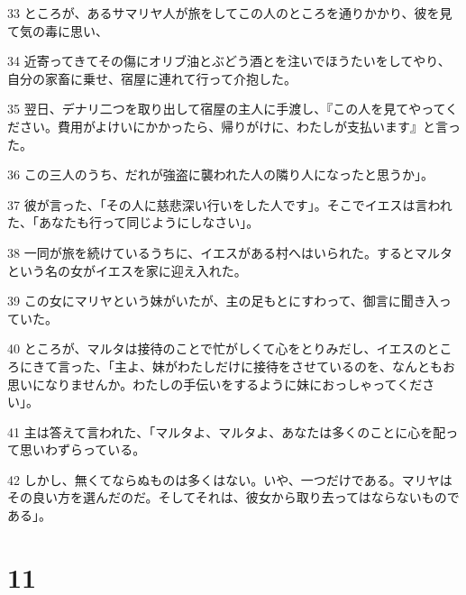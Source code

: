 \par 33 ところが、あるサマリヤ人が旅をしてこの人のところを通りかかり、彼を見て気の毒に思い、
\par 34 近寄ってきてその傷にオリブ油とぶどう酒とを注いでほうたいをしてやり、自分の家畜に乗せ、宿屋に連れて行って介抱した。
\par 35 翌日、デナリ二つを取り出して宿屋の主人に手渡し、『この人を見てやってください。費用がよけいにかかったら、帰りがけに、わたしが支払います』と言った。
\par 36 この三人のうち、だれが強盗に襲われた人の隣り人になったと思うか」。
\par 37 彼が言った、「その人に慈悲深い行いをした人です」。そこでイエスは言われた、「あなたも行って同じようにしなさい」。
\par 38 一同が旅を続けているうちに、イエスがある村へはいられた。するとマルタという名の女がイエスを家に迎え入れた。
\par 39 この女にマリヤという妹がいたが、主の足もとにすわって、御言に聞き入っていた。
\par 40 ところが、マルタは接待のことで忙がしくて心をとりみだし、イエスのところにきて言った、「主よ、妹がわたしだけに接待をさせているのを、なんともお思いになりませんか。わたしの手伝いをするように妹におっしゃってください」。
\par 41 主は答えて言われた、「マルタよ、マルタよ、あなたは多くのことに心を配って思いわずらっている。
\par 42 しかし、無くてならぬものは多くはない。いや、一つだけである。マリヤはその良い方を選んだのだ。そしてそれは、彼女から取り去ってはならないものである」。

\chapter{11}

